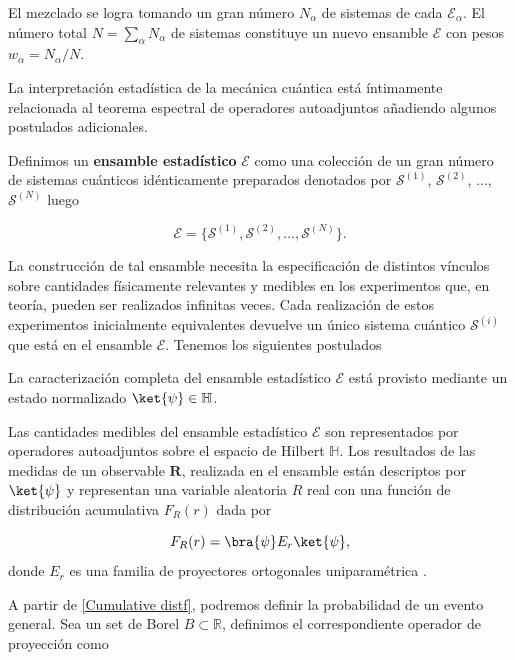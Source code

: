  El mezclado se logra tomando un gran número $N_\alpha$ de sistemas de cada $\mathcal{E}_{\alpha}$. El número total $N  = \sum_{\alpha} N_{\alpha}$ de sistemas constituye un nuevo ensamble $\mathcal{E}$ con pesos $w_{\alpha} = N_{\alpha} / N$.
 
 
La interpretación estadística de la mecánica cuántica está íntimamente relacionada al teorema espectral de operadores autoadjuntos añadiendo algunos postulados adicionales.

Definimos un \textbf{ensamble estadístico} $\mathcal{E}$ como una colección de un gran número de sistemas cuánticos idénticamente preparados denotados por $\mathcal{S}^{(1)}$,  $\mathcal{S}^{(2)}$, ...,  $\mathcal{S}^{(N)}$ luego

\begin{equation}
    \mathcal{E} = \{\mathcal{S}^{(1)},\mathcal{S}^{(2)},...,\mathcal{S}^{(N)}\}.
\end{equation}
 
 La construcción de tal ensamble necesita la especificación de distintos vínculos sobre cantidades físicamente relevantes y medibles en los experimentos que, en teoría, pueden ser realizados infinitas veces. 
 Cada realización de estos experimentos inicialmente equivalentes devuelve un único sistema cuántico $\mathcal{S}^{(i)}$ que está en el ensamble $\mathcal{E}$. Tenemos los siguientes postulados
 
 \begin{post}
 \label{Post1} La caracterización completa del ensamble estadístico $\mathcal{E}$ está provisto mediante un estado normalizado $\ket{\psi} \in \mathbb{H}$.
 \end{post}
 \begin{post} \label{Post2}
 Las cantidades medibles del ensamble estadístico $\mathcal{E}$ son representados por operadores autoadjuntos sobre el espacio de Hilbert $\mathbb{H}$. Los resultados de las medidas de un observable $\mathbf{R}$, realizada en el ensamble están descriptos por $\ket{\psi}$ y representan una variable aleatoria $R$ real con una función de distribución acumulativa $F_R(r)$ dada por 
 
 \begin{equation}
     F_R (r) = \bra{\psi}E_r \ket{\psi},
     \label{Cumulative distf}
 \end{equation}
 donde $E_r$ es una familia de proyectores ortogonales uniparamétrica \cite[p.~60]{HeinzPetruccione}.
 \end{post}
 
 A partir de \eqref{Cumulative distf}, podremos definir la probabilidad de un evento general. Sea un set de Borel $B \subset \mathbb{R}$, definimos el correspondiente operador de proyección como 
 
